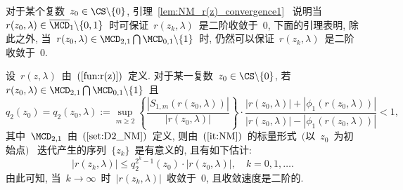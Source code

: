 
对于某个复数~$z_0 \in \CS\backslash\{0\}$,
引理~\ref{lem:NM_r(z)_convergence1}~ 说明当~$r(z_0,\lambda) \in
\overline{\MCD}_1\backslash\{0,1\}$~时可保证~$r(z_k,\lambda)$~是二阶收敛于~0,
下面的引理表明, 除此之外, 当~$r(z_0,\lambda) \in \MCD_{2,1} \bigcap
\MCD_{0,1}\backslash\{1\}$~时,
仍然可以保证~$r(z_k,\lambda)$~是二阶收敛于~0.

\begin{lemma}
\label{lem:NM_r(z)_convergence2} %

设~$r(z,\lambda)$~由~$(\ref{fun:r(z)})$~定义. 对于某一复数~$z_0 \in
\CS\backslash\{0\}$, 若~$r(z_0,\lambda) \in \MCD_{2,1} \bigcap
\MCD_{0,1}\backslash\{1\}$~且
\begin{equation}
\label{cons:NM_q2(z0)} q_2(z_0) = q_2(z_0,\lambda) := \sup_{m \geq
2} \left\{\frac{|S_{1,m}(r(z_0,\lambda))|}{|r(z_0,\lambda)|}\right\}
\cdot \frac{|r(z_0,\lambda)|
+|\phi_1(r(z_0,\lambda))|}{|r(z_0,\lambda)| -
|\phi_1(r(z_0,\lambda))|} < 1,
\end{equation}
其中~$\MCD_{2,1}$~由~$(\ref{set:D2_NM})$~定义,
则由~$(\ref{it:NM})$~的标量形式~$($以~$z_0$~为初始点$)$~
迭代产生的序列~$\{z_k\}$~是有意义的,
且有如下估计:
\begin{equation}
\label{ineq:NM_abs_r(zk)_2} |r(z_k,\lambda)| \leq q_2^{2^k-1}(z_0)
\cdot |r(z_0,\lambda)|, \quad k = 0, 1, \ldots.
\end{equation}
由此可知, 当~$k \to \infty$~时~$|r(z_k,\lambda)|$~收敛于~$0$,
且收敛速度是二阶的.
\end{lemma}

